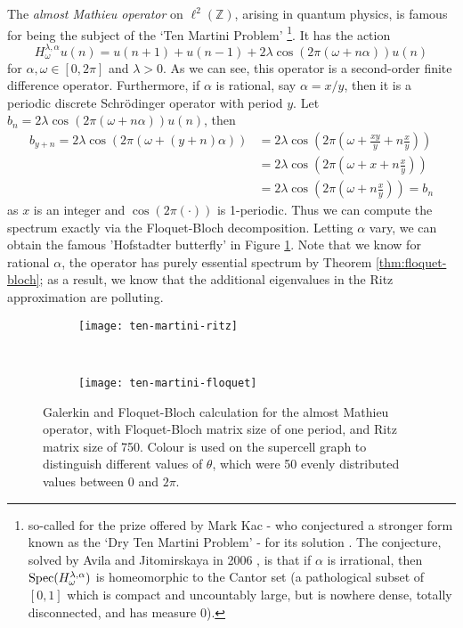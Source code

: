 \documentclass[../main.tex]{subfiles}
\begin{document}
\begin{example}
The \emph{almost Mathieu operator} on $\ell^2(\mathbb{Z})$, arising in quantum physics,
is famous for being the subject of the `Ten Martini Problem' \footnote{so-called
for the prize offered by Mark Kac - who conjectured a stronger form known as the
`Dry Ten Martini Problem' - for its solution \cite{simon1982almost}.
The conjecture, solved by Avila and Jitomirskaya in 2006 \cite{avila2006ten},
is that if $\alpha$ is irrational, then $\mathrm{Spec}(H_\omega^{\lambda, \alpha})$
is homeomorphic to the Cantor set (a pathological subset of $[0, 1]$ which is 
compact and uncountably large, but is nowhere dense, totally disconnected, and has measure 0).}.
It has the action
  $$H_\omega^{\lambda, \alpha} u(n) = u(n+1) + u(n-1) + 2\lambda \cos(2\pi (\omega + n \alpha))u(n)$$
for $\alpha, \omega \in [0, 2\pi]$ and $\lambda > 0$. As we can see, this
operator is a second-order finite difference operator. Furthermore, if
$\alpha$ is rational, say $\alpha = x/y$, then it is a periodic discrete
Schr\"odinger operator with period $y$.
Let $b_n = 2\lambda \cos(2\pi (\omega + n \alpha))u(n)$, then
\begin{align*} 
  b_{y+n} = 2\lambda \cos(2\pi (\omega + (y + n) \alpha)) 
	& = 2\lambda \cos(2\pi (\omega +  \frac{xy}{y} + n \frac{x}{y})) \\
  & = 2\lambda \cos(2\pi (\omega + x + n \frac{x}{y})) \\
  & = 2\lambda \cos(2\pi (\omega + n \frac{x}{y})) = b_n 
\end{align*}
  as $x$ is an integer and $\cos(2\pi(\cdot))$ is 1-periodic. Thus we can compute the
spectrum exactly via the Floquet-Bloch decomposition. Letting $\alpha$ vary, we can obtain
the famous 'Hofstadter butterfly' \cite{hofstadter1976energy} in Figure \ref{fig:hofstadter-butterfly}.
Note that we know for rational $\alpha$, the operator has purely essential spectrum
by Theorem \ref{thm:floquet-bloch}; as a result,
we know that the additional eigenvalues in the Ritz approximation are polluting. 

\begin{figure}[p!] \centering
\begin{subfigure}{0.9\textwidth}
  \texttt{[image: ten-martini-ritz]}
  \end{subfigure}\\
  \begin{subfigure}{0.9\textwidth}
  \texttt{[image: ten-martini-floquet]} \end{subfigure}
\caption{Galerkin and Floquet-Bloch calculation for the almost Mathieu operator, 
  with Floquet-Bloch matrix
	size of one period, and Ritz matrix size of 750.
  Colour is used on the supercell graph to
	distinguish different values of $\theta$, which were 50 evenly
	distributed values between $0$ and $2 \pi$.}

\label{fig:hofstadter-butterfly}
\end{figure}
\clearpage
\end{example}
\end{document}
